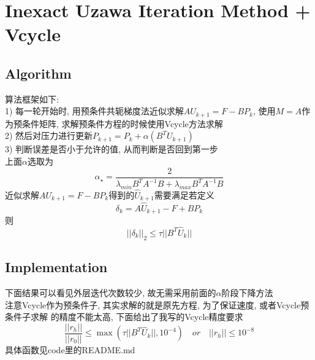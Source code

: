 \documentclass{article}
\begin{document}
\section{Inexact Uzawa Iteration Method + Vcycle}
\subsection{Algorithm}
算法框架如下:\\
1) 每一轮开始时, 用预条件共轭梯度法近似求解$AU_{k+1}=F-BP_k$, 
使用$M=A$作为预条件矩阵, 求解预条件方程的时候使用Vcycle方法求解\\
2) 然后对压力进行更新$P_{k+1}=P_k+\alpha(B^TU_{k+1})$\\
3) 判断误差是否小于允许的值, 从而判断是否回到第一步\\
上面$\alpha$选取为\\
$$
\alpha_{\star}=\frac{2}{\lambda_{min}{B^TA^{-1}B}+\lambda_{max}{B^TA^{-1}B}}
$$
近似求解$AU_{k+1}=F-BP_k$得到的$\hat{U}_{k+1}$需要满足若定义$$
\delta_k = A\hat{U}_{k+1}-F+BP_k
$$
则
$$
||\delta_k||_2 \leq \tau||B^T\hat{U}_k||
$$
\subsection{Implementation}
下面结果可以看见外层迭代次数较少, 故无需采用前面的$\alpha$阶段下降方法\\
注意Vcycle作为预条件子, 其实求解的就是原先方程, 为了保证速度, 或者Vcycle预条件子求解
的精度不能太高, 下面给出了我写的Vcycle精度要求\\
$$
\frac{||r_h||}{||r_0||} \leq \max(\tau||B^T\hat{U}_k||,10^{-4})\quad
or \quad ||r_h|| \leq 10^{-8}
$$
具体函数见code里的README.md\\
\end{document}
